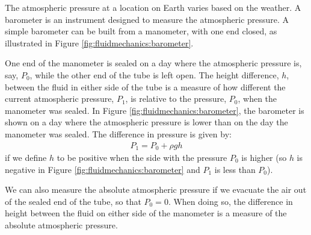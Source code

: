 {The atmospheric pressure at a location on Earth varies based on the weather. A barometer is an instrument designed to measure the atmospheric pressure. A simple barometer can be built from a manometer, with one end closed, as illustrated in Figure \ref{fig:fluidmechanics:barometer}.
{
One end of the manometer is sealed on a day where the atmospheric pressure is, say, $P_0$, while the other end of the tube is left open. The height difference, $h$, between the fluid in either side of the tube is a measure of how different the current atmospheric pressure, $P_1$, is relative to the pressure, $P_0$, when the manometer was sealed. In Figure \ref{fig:fluidmechanics:barometer}, the barometer is shown on a day where the atmospheric pressure is lower than on the day the manometer was sealed. The difference in pressure is given by:
\begin{align*}
P_1 = P_0 + \rho g h
\end{align*}
if we define $h$ to be positive when the side with the pressure $P_0$ is higher (so $h$ is negative in Figure \ref{fig:fluidmechanics:barometer} and $P_1$ is less than $P_0$).

We can also measure the absolute atmospheric pressure if we evacuate the air out of the sealed end of the tube, so that $P_0=0$. When doing so, the difference in height between the fluid on either side of the manometer is a measure of the absolute atmospheric pressure.

}}
